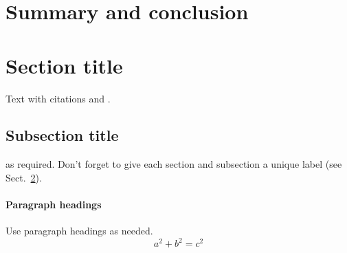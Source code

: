 \documentclass[twocolumn]{svjour3}          %
\begin{document}
\section{Summary and conclusion}

\section{Section title}
\label{sec:1}
Text with citations \cite{RefB} and \cite{RefJ}.
\subsection{Subsection title}
\label{sec:2}
as required. Don't forget to give each section
and subsection a unique label (see Sect.~\ref{sec:1}).
\paragraph{Paragraph headings} Use paragraph headings as needed.
\begin{equation}
a^2+b^2=c^2
\end{equation}

%
%
\end{document}
